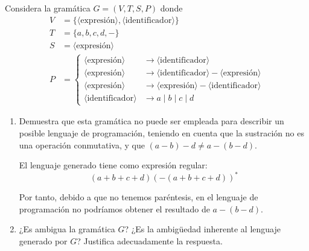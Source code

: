 \begin{ejercicio}\label{ej:1.4.3}
    Considera la gramática $G = (V, T, S, P)$ donde
    \begin{equation*}
        \begin{aligned}
            V &= \{ \langle \text{expresión} \rangle, \langle \text{identificador} \rangle \} \\
            T &= \{ a, b, c, d, - \} \\
            S &= \langle \text{expresión} \rangle \\
            P &= \left\{
                \begin{aligned}
                    \langle \text{expresión} \rangle &\rightarrow \langle \text{identificador} \rangle \\
                    \langle \text{expresión} \rangle &\rightarrow \langle \text{identificador} \rangle - \langle \text{expresión} \rangle \\
                    \langle \text{expresión} \rangle &\rightarrow \langle \text{expresión} \rangle - \langle \text{identificador} \rangle \\
                    \langle \text{identificador} \rangle &\rightarrow a \mid b \mid c \mid d
                \end{aligned}
            \right.
        \end{aligned}
    \end{equation*}
    \begin{enumerate}
        \item Demuestra que esta gramática no puede ser empleada para describir un posible lenguaje de programación, teniendo en cuenta que la sustración no es una operación conmutativa, y que $(a - b) - d \neq a - (b - d)$.
        
        El lenguaje generado tiene como expresión regular:
        \begin{equation*}
            (a+b+c+d)\left(-(a+b+c+d)\right)^*
        \end{equation*}

        Por tanto, debido a que no tenemos paréntesis, en el lenguaje de programación no podríamos obtener el resultado de $a-(b-d)$.

        \item ¿Es ambigua la gramática $G$? ¿Es la ambigüedad inherente al lenguaje generado por $G$? Justifica adecuadamente la respuesta.
        

\end{enumerate}
\end{ejercicio}
